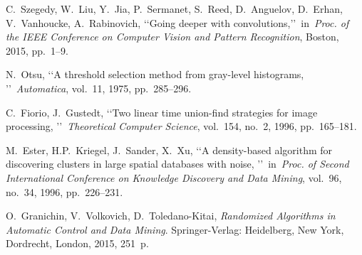 \documentclass[conference,a4paper]{ieeetran}
\begin{document}
\begin{thebibliography}{99}
 C.~Szegedy, W.~Liu, Y.~Jia, P.~Sermanet, S.~Reed, D.~Anguelov, D.~Erhan, V.~Vanhoucke, A.~Rabinovich, \lq\lq Going deeper with convolutions,\rq\rq~in~\emph{Proc. of the IEEE Conference on Computer Vision and Pattern Recognition}, Boston, 2015, pp.~1--9.

 N.~Otsu, \lq\lq A threshold selection method from gray-level histograms, \rq\rq~\emph{Automatica}, vol.~11, 1975, pp.~285--296.

 C.~Fiorio, J.~Gustedt, \lq\lq Two linear time union-find strategies for image processing, \rq\rq~\emph{Theoretical Computer Science}, vol.~154, no.~2, 1996, pp.~165--181.

 M.~Ester, H.P.~Kriegel, J.~Sander, X.~Xu, \lq\lq A density-based algorithm for discovering clusters in large spatial databases with noise, \rq\rq~in~\emph{Proc. of Second International
Conference on Knowledge Discovery and Data Mining}, vol.~96, no.~34, 1996, pp.~226--231.

 O.~Granichin, V.~Volkovich, D.~Toledano-Kitai, \emph{Randomized Algorithms in Automatic Control and Data Mining}. Springer-Verlag: Heidelberg, New York, Dordrecht, London, 2015, 251~p.

\end{thebibliography}
\end{document}
